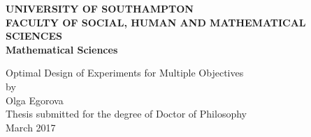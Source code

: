 \documentclass[titlepage,twoside,openright,final,11pt]{report}
\newcommand\blankpage{%
    \null
    \thispagestyle{empty}%
    \addtocounter{page}{-1}%
    \newpage}
\begin{document}
\begin{titlepage}

\begin{center}

\huge \bfseries  UNIVERSITY OF SOUTHAMPTON\\

\vspace{0.8cm}
\Large FACULTY OF SOCIAL, HUMAN AND MATHEMATICAL SCIENCES\\
\Large  Mathematical Sciences

\vspace{6cm}

\Large Optimal Design of Experiments for Multiple Objectives \\

\vspace{1cm}
\large by \\

\vspace{1cm}
\Large Olga Egorova \\

\vspace{8cm}
 \Large Thesis submitted for the degree of Doctor of Philosophy \\
\Large March 2017
\end{center}
\afterpage{\blankpage}
\end{titlepage}
\end{document}
